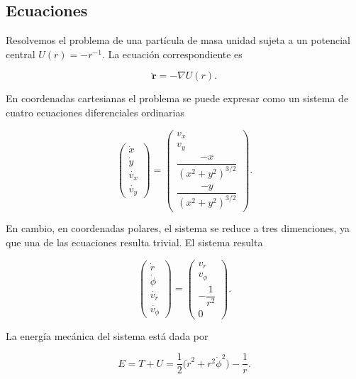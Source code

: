 \documentclass[12pt]{article}
\begin{document}
\subsection{Ecuaciones}

Resolvemos el problema de una part\'icula de masa unidad sujeta a un potencial central $U(r) = -r^{-1}$. La ecuaci\'on correspondiente es

\begin{equation} \label{eq:central}
\ddot{\mathbf{r}} = -\nabla U(r).
\end{equation}

En coordenadas cartesianas el problema se puede expresar como un sistema de cuatro ecuaciones diferenciales ordinarias 

\begin{equation}
\begin{pmatrix}
\dot{x} \\
\dot{y} \\
\dot{v_x} \\
\dot{v_y}
\end{pmatrix} = 
\begin{pmatrix}
v_x \\
v_y \\
\dfrac{-x}{(x^2 + y^2)^{3/2}} \\
\dfrac{-y}{(x^2 + y^2)^{3/2}}
\end{pmatrix}.
\end{equation}

En cambio, en coordenadas polares, el sistema se reduce a tres dimenciones, ya que una de las ecuaciones resulta trivial. El sistema resulta

\begin{equation}
\begin{pmatrix}
\dot{r} \\
\dot{\phi} \\
\dot{v_r} \\
\dot{v_{\phi}}
\end{pmatrix} = 
\begin{pmatrix}
v_r \\
v_{\phi} \\
-\dfrac{1}{r^2} \\
0
\end{pmatrix}.
\end{equation}

La energ\'ia mec\'anica del sistema est\'a dada por 

\begin{equation}
E = T + U = \dfrac{1}{2} \bigg( \dot{r}^2 + r^2 \dot{\phi}^2 \bigg) - \dfrac{1}{r}.
\end{equation}
\end{document}
